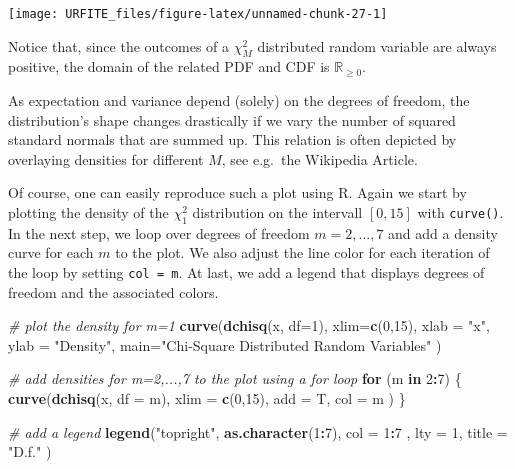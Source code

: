 \documentclass[]{book}
\newenvironment{Shaded}{\begin{snugshade}}{\end{snugshade}}
\newcommand{\KeywordTok}[1]{\textcolor[rgb]{0.13,0.29,0.53}{\textbf{#1}}}
\newcommand{\DataTypeTok}[1]{\textcolor[rgb]{0.13,0.29,0.53}{#1}}
\newcommand{\DecValTok}[1]{\textcolor[rgb]{0.00,0.00,0.81}{#1}}
\newcommand{\StringTok}[1]{\textcolor[rgb]{0.31,0.60,0.02}{#1}}
\newcommand{\CommentTok}[1]{\textcolor[rgb]{0.56,0.35,0.01}{\textit{#1}}}
\newcommand{\ControlFlowTok}[1]{\textcolor[rgb]{0.13,0.29,0.53}{\textbf{#1}}}
\newcommand{\OperatorTok}[1]{\textcolor[rgb]{0.81,0.36,0.00}{\textbf{#1}}}
\newcommand{\NormalTok}[1]{#1}
\theoremstyle{definition}
\theoremstyle{definition}
\theoremstyle{definition}
\theoremstyle{remark}
\begin{document}
\begin{center}\texttt{[image: URFITE\_files/figure-latex/unnamed-chunk-27-1]} \end{center}

Notice that, since the outcomes of a \(\chi^2_M\) distributed random
variable are always positive, the domain of the related PDF and CDF is
\(\mathbb{R}_{\geq0}\).

As expectation and variance depend (solely) on the degrees of freedom,
the distribution's shape changes drastically if we vary the number of
squared standard normals that are summed up. This relation is often
depicted by overlaying densities for different \(M\), see e.g.~the
Wikipedia Article.

Of course, one can easily reproduce such a plot using R. Again we start
by plotting the density of the \(\chi_1^2\) distribution on the
intervall \([0,15]\) with \texttt{curve()}. In the next step, we loop
over degrees of freedom \(m=2,...,7\) and add a density curve for each
\(m\) to the plot. We also adjust the line color for each iteration of
the loop by setting \texttt{col\ =\ m}. At last, we add a legend that
displays degrees of freedom and the associated colors.

\begin{Shaded}
\begin{Highlighting}[]
\CommentTok{# plot the density for m=1}
\KeywordTok{curve}\NormalTok{(}\KeywordTok{dchisq}\NormalTok{(x, }\DataTypeTok{df=}\DecValTok{1}\NormalTok{), }
      \DataTypeTok{xlim=}\KeywordTok{c}\NormalTok{(}\DecValTok{0}\NormalTok{,}\DecValTok{15}\NormalTok{), }
      \DataTypeTok{xlab =} \StringTok{"x"}\NormalTok{, }
      \DataTypeTok{ylab =} \StringTok{"Density"}\NormalTok{, }
      \DataTypeTok{main=}\StringTok{"Chi-Square Distributed Random Variables"}
\NormalTok{      )}

\CommentTok{# add densities for m=2,...,7 to the plot using a for loop }
\ControlFlowTok{for}\NormalTok{ (m }\ControlFlowTok{in} \DecValTok{2}\OperatorTok{:}\DecValTok{7}\NormalTok{) \{}
  \KeywordTok{curve}\NormalTok{(}\KeywordTok{dchisq}\NormalTok{(x, }\DataTypeTok{df =}\NormalTok{ m),}
        \DataTypeTok{xlim =} \KeywordTok{c}\NormalTok{(}\DecValTok{0}\NormalTok{,}\DecValTok{15}\NormalTok{), }
        \DataTypeTok{add =}\NormalTok{ T, }
        \DataTypeTok{col =}\NormalTok{ m}
\NormalTok{        )}
\NormalTok{\}}

\CommentTok{# add a legend}
\KeywordTok{legend}\NormalTok{(}\StringTok{"topright"}\NormalTok{, }
       \KeywordTok{as.character}\NormalTok{(}\DecValTok{1}\OperatorTok{:}\DecValTok{7}\NormalTok{), }
       \DataTypeTok{col =} \DecValTok{1}\OperatorTok{:}\DecValTok{7}\NormalTok{ , }
       \DataTypeTok{lty =} \DecValTok{1}\NormalTok{, }
       \DataTypeTok{title =} \StringTok{"D.f."}
\NormalTok{       )}
\end{Highlighting}
\end{Shaded}
\end{document}
